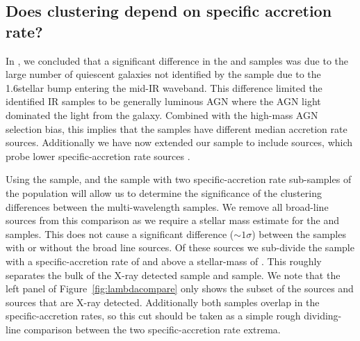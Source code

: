 \begin{figure*}
  \caption{ 
Comparison of the specific accretion rate samples.
Large left panel: specific accretion rate and mass limits.
Middle panels: comparison of high $\lambda$ \Xray and \Donley samples.
Right panels: comparison of low $\lambda$ \Xray and \Radio samples.
We find that the \Donley sample is clustered like high specific accretion rate \Xray sources and the \Radio sample is clustered like low specific accretion rate \Xray sources.
}
  \label{fig:lambdacompare}
\end{figure*}

\subsection{Does clustering depend on specific accretion rate?}\label{sec:lambdadiscussion}
In \citet{Mendez13}, we concluded that a significant difference in the \IR and \Xray samples was due to the large number of quiescent galaxies not identified by the \IR sample due to the 1.6\um stellar bump entering the mid-IR waveband.
This difference limited the identified IR samples to be generally luminous AGN where the AGN light dominated the light from the galaxy.
Combined with the high-mass AGN selection bias, this implies that the samples have different median accretion rate sources.
Additionally we have now extended our sample to include \Radio sources, which probe lower specific-accretion rate sources \citep{Hickox09}.

Using the \Radio sample, and the \Donley sample with two specific-accretion rate sub-samples of the \Xray population will allow us to determine the significance of the clustering differences between the multi-wavelength samples.
We remove all broad-line sources from this comparison as we require a stellar mass estimate for the \highlambda \Xray and \lowlambda \Xray samples.
This does not cause a significant difference ($\sim1\sigma$) between the samples with or without the broad line sources.
Of these sources we sub-divide the \Xray sample with a specific-accretion rate of  and above a stellar-mass of .
This roughly separates the bulk of the X-ray detected \Radio sample and \Donley sample.
We note that the left panel of Figure~\ref{fig:lambdacompare} only shows the subset of the \Radio sources and \Donley sources that are X-ray detected.
Additionally both samples overlap in the specific-accretion rates, so this cut should be taken as a simple rough dividing-line comparison between the two specific-accretion rate extrema.

